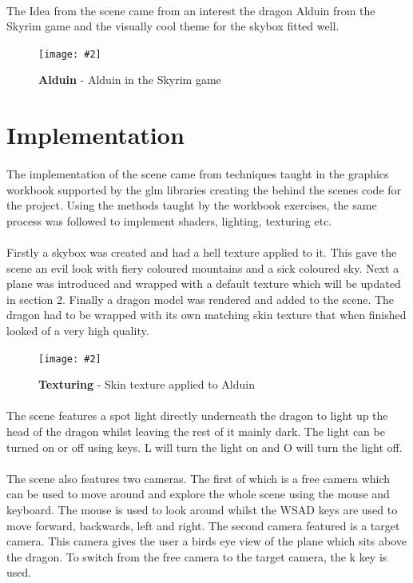 \documentclass[10pt, a4paper]{article}
\newcommand{\figuremacro}[5]{
    \begin{figure}[#1]
        \centering
        \texttt{[image: \#2]}
        \caption[#3]{\textbf{#3}#4}
        \label{fig:#2}
    \end{figure}
}
\begin{document}
	\paragraph{}
	The Idea from the scene came from an interest the dragon Alduin from the Skyrim game and the visually cool theme for the skybox fitted well.
	
	\figuremacro{h}{alduin}{Alduin}{ - Alduin in the Skyrim game}{1.0}
	 
	\section{Implementation}
	\paragraph{}
	The implementation of the scene came from techniques taught in the graphics workbook supported by the glm libraries creating the behind the scenes code for the project. Using the methods taught by the workbook exercises, the same process was followed to implement shaders, lighting, texturing etc.
	
	\paragraph{}
	Firstly a skybox was created and had a hell texture applied to it. This gave the scene an evil look with fiery coloured mountains and a sick coloured sky. Next a plane was introduced and wrapped with a default texture which will be updated in section 2. Finally a dragon model was rendered and added to the scene. The dragon had to be wrapped with its own matching skin texture that when finished looked of a very high quality.
	
	\figuremacro{h}{dragon_texture}{Texturing}{ - Skin texture applied to Alduin}{1.0}
	
	\paragraph{}
	The scene features a spot light directly underneath the dragon to light up the head of the dragon whilst leaving the rest of it mainly dark. The light can be turned on or off using keys. L will turn the light on and O will turn the light off.
	
	\paragraph{}
	The scene also features two cameras. The first of which is a free camera which can be used to move around and explore the whole scene using the mouse and keyboard. The mouse is used to look around whilst the WSAD keys are used to move forward, backwards, left and right. The second camera featured is a target camera. This camera gives the user a birds eye view of the plane which sits above the dragon. To switch from the free camera to the target camera, the k key is used.
	 
\end{document}
